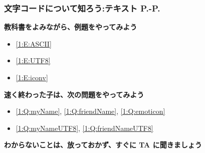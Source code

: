 \documentclass[dvipdfmx]{beamer}
\begin{document}
\begin{frame}[fragile]
	\frametitle{文字コードについて知ろう:テキスト P.\pageref{1:P:charCode}-P.\pageref{1:P:scraping}~~~}
      \large\textbf{教科書をよみながら、例題をやってみよう}
				\begin{itemize}
					\item \ref*{1:E:ASCII}
					\item \ref*{1:E:UTF8}
					\item \ref*{1:E:iconv}
				\end{itemize}
      \vfill
      \large\textbf{速く終わった子は、次の問題をやってみよう}
				\begin{itemize}
					\item \ref*{1:Q:myName}, \ref*{1:Q:friendName}, \ref*{1:Q:emoticon}
					\item \ref*{1:Q:myNameUTF8}, \ref*{1:Q:friendNameUTF8}
				\end{itemize}
      \vfill
      \large\textbf{わからないことは、放っておかず、すぐに TA に聞きましょう}
\end{frame}
\end{document}
